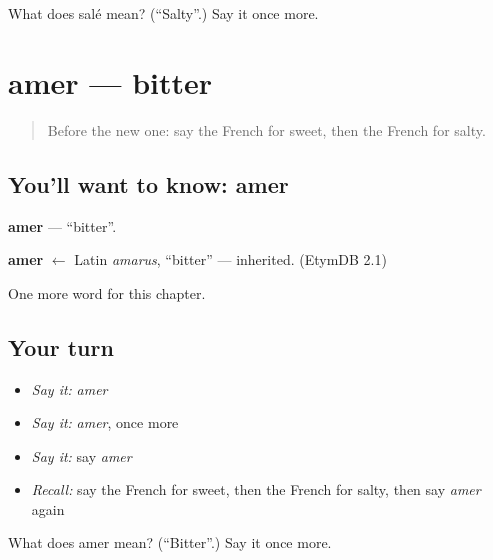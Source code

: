 \begin{tcolorbox}[breakable,colback=teal!4,colframe=teal!35!black,title={Before you move on}]
What does salé mean? (\textquotedblleft{}Salty\textquotedblright{}.) Say it once more.
\end{tcolorbox}
\section[amer]{amer — bitter}

\label{lesson:FR-C94-amer}



\begin{quote}
Before the new one: say the French for sweet, then the French for salty.
\end{quote}

\subsection*{You'll want to know: amer}
\textbf{amer} — \textquotedblleft{}bitter\textquotedblright{}.

\begin{cousinweb}
\textbf{amer} $\leftarrow$ Latin \emph{amarus}, \textquotedblleft{}bitter\textquotedblright{} — inherited. (EtymDB 2.1)
\end{cousinweb}

\begin{grammarlens}[title={What you've built}]
One more word for this chapter.
\end{grammarlens}

\subsection*{Your turn}
\begin{itemize}
\raggedright
  \item \emph{Say it:} \emph{amer}
  \item \emph{Say it:} \emph{amer}, once more
  \item \emph{Say it:} say \emph{amer}
  \item \emph{Recall:} say the French for sweet, then the French for salty, then say \emph{amer} again
\end{itemize}

\begin{tcolorbox}[breakable,colback=teal!4,colframe=teal!35!black,title={Before you move on}]
What does amer mean? (\textquotedblleft{}Bitter\textquotedblright{}.) Say it once more.
\end{tcolorbox}
